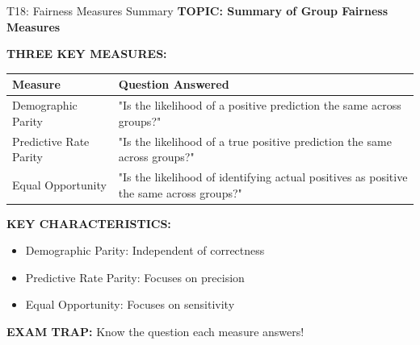\documentclass[8pt]{beamer}
\begin{document}
	\begin{frame}{T18: Fairness Measures Summary}
		\fontsize{6.5}{7.5}\selectfont
		\textbf{TOPIC: Summary of Group Fairness Measures}
		
		\vspace{0.1cm}
		\textbf{THREE KEY MEASURES:}
		
		\begin{tabular}{|p{2.5cm}|p{5cm}|}
			\hline
			\textbf{Measure} & \textbf{Question Answered} \\
			\hline
			Demographic Parity & "Is the likelihood of a positive prediction the same across groups?" \\
			\hline
			Predictive Rate Parity & "Is the likelihood of a true positive prediction the same across groups?" \\
			\hline
			Equal Opportunity & "Is the likelihood of identifying actual positives as positive the same across groups?" \\
			\hline
		\end{tabular}
		
		\vspace{0.1cm}
		\textbf{KEY CHARACTERISTICS:}
		\begin{itemize}
			\item \textcolor{myblue}{Demographic Parity:} Independent of correctness
			\item \textcolor{myblue}{Predictive Rate Parity:} Focuses on precision
			\item \textcolor{myblue}{Equal Opportunity:} Focuses on sensitivity
		\end{itemize}
		
		\textcolor{myred}{\textbf{EXAM TRAP:}} Know the \textcolor{myblue}{question each measure answers}!
	\end{frame}
	
\end{document}
